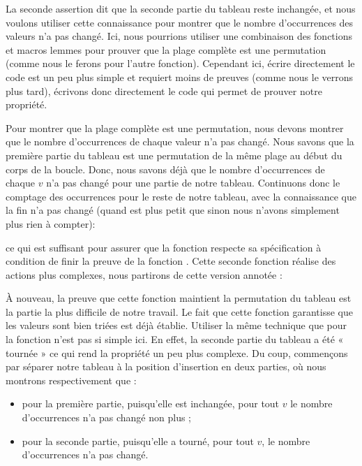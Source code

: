 La seconde assertion dit que la seconde partie du tableau reste inchangée, et nous
voulons utiliser cette connaissance pour montrer que le nombre d'occurrences des
valeurs n'a pas changé. Ici, nous pourrions utiliser une combinaison des
fonctions et macros lemmes pour prouver que la plage complète est une
permutation (comme nous le ferons pour l'autre fonction). Cependant ici, écrire
directement le code est un peu plus simple et requiert moins de preuves (comme
nous le verrons plus tard), écrivons donc directement le code qui permet de
prouver notre propriété.


Pour montrer que la plage complète est une permutation, nous devons montrer que le
nombre d'occurrences de chaque valeur n'a pas changé. Nous savons que la première
partie du tableau est une permutation de la même plage au début du corps de la
boucle. Donc, nous savons déjà que le nombre d'occurrences de chaque $v$ n'a pas
changé pour une partie de notre tableau. Continuons donc le comptage des
occurrences pour le reste de notre tableau, avec la connaissance que la fin n'a
pas changé (quand  est plus petit que  sinon
nous n'avons simplement plus rien à compter):




ce qui est suffisant pour assurer que la fonction 
respecte sa spécification à condition de finir la preuve de la fonction
. Cette seconde fonction réalise des actions plus
complexes, nous partirons de cette version annotée :




À nouveau, la preuve que cette fonction maintient la permutation du tableau est
la partie la plus difficile de notre travail. Le fait que cette fonction
garantisse que les valeurs sont bien triées est déjà établie. Utiliser la
même technique que pour la fonction  n'est pas si
simple ici. En effet, la seconde partie du tableau a été « tournée » ce qui
rend la propriété un peu plus complexe. Du coup, commençons par séparer notre
tableau à la position d'insertion en deux parties, où nous montrons
respectivement que :


\begin{itemize}
    \item pour la première partie, puisqu'elle est inchangée, pour tout $v$
          le nombre d'occurrences n'a pas changé non plus ;
    \item pour la seconde partie, puisqu'elle a tourné, pour tout $v$, le
          nombre d'occurrences n'a pas changé.
\end{itemize}



